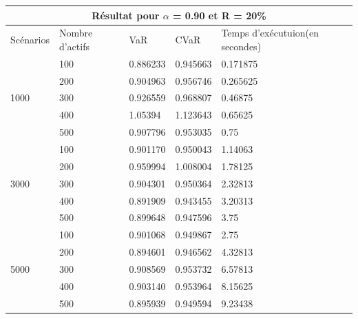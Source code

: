 \documentclass[12pt]{article}
\theoremstyle{definition}
\theoremstyle{definition}
\begin{document}
\begin{tabular}{|l|l|l|l|l|}
  \hline
  \multicolumn{5}{|c|}{Résultat pour \textbf{$\alpha$ = 0.90} et \textbf{R = 20\%}} \\
  \hline
  Scénarios & Nombre d'actifs & VaR & CVaR & Temps d'exécutuion(en secondes)\\ \hline
  \multirow{5}{*}{1000} & 100 & 0.886233 & 0.945663 & 0.171875\\
    & 200 & 0.904963 & 0.956746 & 0.265625\\
    & 300 & 0.926559 & 0.968807 & 0.46875\\
    & 400 & 1.05394 & 1.123643 & 0.65625\\ 
    & 500 & 0.907796 & 0.953035 & 0.75\\ \hline
  \multirow{5}{*}{3000} & 100 & 0.901170 & 0.950043 & 1.14063\\
    & 200 & 0.959994 & 1.008004 & 1.78125\\
    & 300 & 0.904301 & 0.950364 & 2.32813\\
    & 400 & 0.891909 & 0.943455 & 3.20313\\ 
    & 500 & 0.899648 & 0.947596 & 3.75\\ \hline
  \multirow{5}{*}{5000} & 100 & 0.901068 & 0.949867 & 2.75\\
    & 200 & 0.894601 & 0.946562 & 4.32813\\
    & 300 & 0.908569 & 0.953732 & 6.57813\\
    & 400 & 0.903140 & 0.953964 & 8.15625\\ 
    & 500 & 0.895939 & 0.949594 & 9.23438\\ \hline
\end{tabular}
\end{document}
